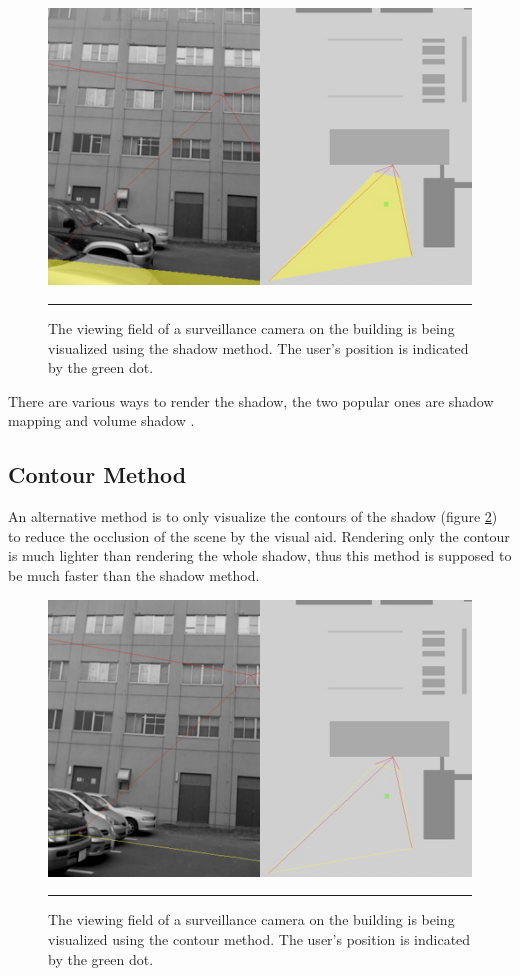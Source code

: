 \begin{figure}[htbp]
	\centering
	\includegraphics[width=14cm]{./Primitives/theory_shadow.png}
	\rule{35em}{0.5pt}
	\caption[Shadow method]{The viewing field of a surveillance camera on the building is being visualized using the shadow method. The user's position is indicated by the green dot.}
	\label{fig:ShadowMethod}
\end{figure}

There are various ways to render the shadow, the two popular ones are shadow mapping \cite{Reference7} \cite{Reference8} and volume shadow \cite{Reference9}.

\subsection{Contour Method}

An alternative method is to only visualize the contours of the shadow (figure \ref{fig:ContourMethod}) to reduce the occlusion of the scene by the visual aid. Rendering only the contour is much lighter than rendering the whole shadow, thus this method is supposed to be much faster than the shadow method.

\begin{figure}[htbp]
	\centering
	\includegraphics[width=14cm]{./Primitives/theory_contour.png}
	\rule{35em}{0.5pt}
	\caption[Contour method]{The viewing field of a surveillance camera on the building is being visualized using the contour method. The user's position is indicated by the green dot.}
	\label{fig:ContourMethod}
\end{figure}

